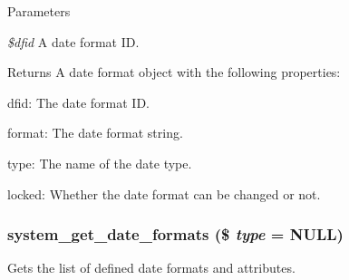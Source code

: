 \begin{DoxyParams}{Parameters}
\item[{\em \$dfid}]A date format ID.\end{DoxyParams}
\begin{DoxyReturn}{Returns}
A date format object with the following properties:
\begin{DoxyItemize}
\item dfid: The date format ID.
\item format: The date format string.
\item type: The name of the date type.
\item locked: Whether the date format can be changed or not. 
\end{DoxyItemize}
\end{DoxyReturn}
\hypertarget{system_8module_a5505120b882739e9648d8665e6dfd030}{
\subsubsection[{system\_\-get\_\-date\_\-formats}]{\setlength{\rightskip}{0pt plus 5cm}system\_\-get\_\-date\_\-formats (\$ {\em type} = {\ttfamily NULL})}}
\label{system_8module_a5505120b882739e9648d8665e6dfd030}
Gets the list of defined date formats and attributes.



